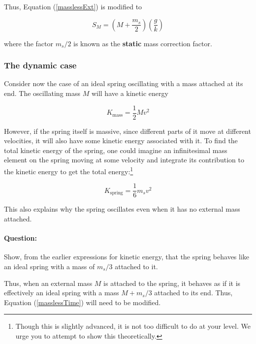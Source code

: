 Thus, Equation (\ref{masslessExt}) is modified to

\begin{equation}
S_M = \left( M + \frac{m_s}{2} \right)\left(\frac{g}{k} \right)
\label{Sm}
\end{equation}

where the factor $m_s/2$ is known as the \textbf{static} mass correction factor.


\subsubsection*{The dynamic case}

Consider now the case of an ideal spring oscillating with a mass attached at its end. The oscillating mass $M$ will have a kinetic energy 

\begin{equation*}
    K_\text{mass} = \frac{1}{2} M v^2
\end{equation*}

However, if the spring itself is massive, since different parts of it move at different velocities, it will also have some kinetic energy associated with it. To find the total kinetic energy of the spring, one could imagine an infinitesimal mass element on the spring moving at some velocity and integrate its contribution to the kinetic energy to get the total energy:\footnote{Though this is slightly advanced, it is not too difficult to do at your level. We urge you to attempt to show this theoretically.}

\begin{equation}
    K_\text{spring} = \frac{1}{6} m_s v^2
\end{equation}

\begin{imp}
This also explains why the spring oscillates even when it has no external mass attached.
\end{imp}

\begin{question}
\paragraph{Question:} Show, from the earlier expressions for kinetic energy, that the spring behaves like an ideal spring with a mass of $m_s/3$ attached to it.
\end{question}

Thus, when an external mass $M$ is attached to the spring, it behaves as if it is effectively an ideal spring with a mass $M+ m_s/3$ attached to its end. Thus, Equation (\ref{masslessTime}) will need to be modified.

